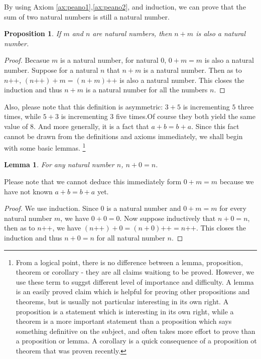 \documentclass[a4paper,oneside]{book}
\newtheorem*{proof}{\textit{Proof.}}
\newtheorem{lemma}{Lemma}[section]
\newtheorem{proposition}{Proposition}[section]
\begin{document}
			By using Axiom \ref{ax:peano1},\ref{ax:peano2}, and induction, we can prove that the sum of two natural numbers is still a natural number. 
			\begin{proposition}
				If $m$ and $n$ are natural numbers, then $n+m$ is also a natural number.
			\end{proposition}
			\begin{proof}
				Becasue $m$ is a natural number, for natural $0$, $0+m=m$ is also a natural number. Suppose for a natural $n$ that $n+m$ is a natural number. Then as to $n\texttt{++}$, $(n\texttt{++})+m = (n+m)\texttt{++}$ is also a natural number. This closes the induction and thus $n+m$ is a natural number for all the numbers $n$.
			\end{proof}
			Also, please note that this definition is asymmetric: $3+5$ is incrementing $5$ three times, while $5+3$ is incrementing $3$ five times.Of course they both yield the same value of $8$. And more generally, it is a fact that $a+b=b+a$. Since this fact cannot be drawn from the definitions and axioms immediately, we shall begin with some basic lemmas.
			\footnote{From a logical point, there is no difference between a lemma, proposition, theorem or corollary - they are all claims waitiong to be proved. However, we use these term to suggst different level of importance and difficulty. A lemma is an easily proved claim which is helpful for proving other propositions and theorems, but is usually not particular interesting in its own right. A proposition is a statement which is interesting in its own right, while a theorem is a more important statement than a proposition which says something definitive on the subject, and often takes more effort to prove than a proposition or lemma. A corollary is a quick consequence of a proposition ot theorem that was proven recently.}\\
			\begin{lemma}
				\label{lam:n+0=n}
				For any natural number $n$, $n+0=n$.
			\end{lemma}
			Please note that we cannot deduce this immediately form $0+m=m$ because we have not known $a+b=b+a$ yet.
			\begin{proof}
				We use induction. Since $0$ is a natural number and $0+m=m$ for every natural number $m$, we have $0+0=0$. Now suppose inductively that $n+0=n$, then as to $n\texttt{++}$, we have $(n\texttt{++})+0=(n+0)\texttt{++}=n\texttt{++}$. This closes the induction and thus $n+0=n$ for all natural number $n$.
			\end{proof}
\end{document}
